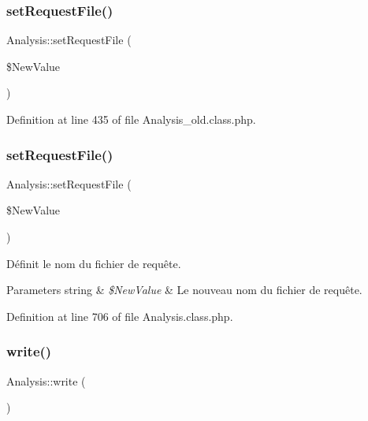 \subsubsection{\texorpdfstring{set\+Request\+File()}{setRequestFile()}\hspace{0.1cm}{\footnotesize\ttfamily [1/2]}}
{\footnotesize\ttfamily Analysis\+::set\+Request\+File (\begin{DoxyParamCaption}\item[{}]{\$\+New\+Value }\end{DoxyParamCaption})}



Definition at line 435 of file Analysis\+\_\+old.\+class.\+php.

\mbox{\label{class_analysis_ab921506f207e5b174d3cdef504721169}} 
\subsubsection{\texorpdfstring{set\+Request\+File()}{setRequestFile()}\hspace{0.1cm}{\footnotesize\ttfamily [2/2]}}
{\footnotesize\ttfamily Analysis\+::set\+Request\+File (\begin{DoxyParamCaption}\item[{}]{\$\+New\+Value }\end{DoxyParamCaption})}

Définit le nom du fichier de requête.


\begin{DoxyParams}[1]{Parameters}
string & {\em \$\+New\+Value} & Le nouveau nom du fichier de requête. \\
\hline
\end{DoxyParams}


Definition at line 706 of file Analysis.\+class.\+php.

\mbox{\label{class_analysis_a809e7010f2899e515a43f8c8840a1e86}} 
\subsubsection{\texorpdfstring{write()}{write()}\hspace{0.1cm}{\footnotesize\ttfamily [1/2]}}
{\footnotesize\ttfamily Analysis\+::write (\begin{DoxyParamCaption}{ }\end{DoxyParamCaption})}



